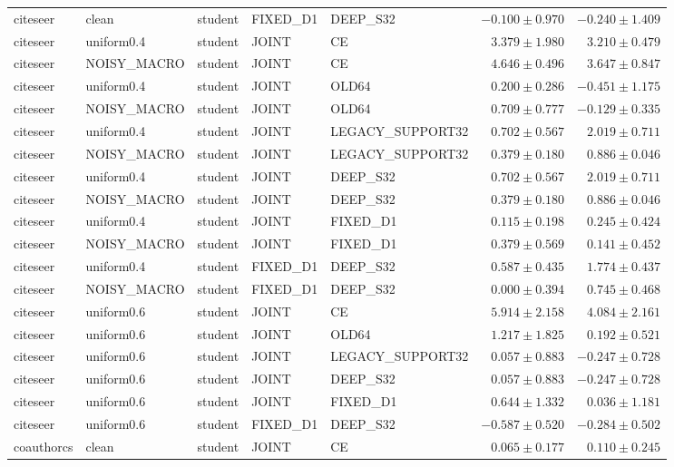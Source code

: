 \begin{longtable}{lllllrr}
citeseer & clean & student & FIXED\_D1 & DEEP\_S32 & $-0.100 \pm 0.970$ & $-0.240 \pm 1.409$ \\
citeseer & uniform0.4 & student & JOINT & CE & $3.379 \pm 1.980$ & $3.210 \pm 0.479$ \\
citeseer & NOISY\_MACRO & student & JOINT & CE & $4.646 \pm 0.496$ & $3.647 \pm 0.847$ \\
citeseer & uniform0.4 & student & JOINT & OLD64 & $0.200 \pm 0.286$ & $-0.451 \pm 1.175$ \\
citeseer & NOISY\_MACRO & student & JOINT & OLD64 & $0.709 \pm 0.777$ & $-0.129 \pm 0.335$ \\
citeseer & uniform0.4 & student & JOINT & LEGACY\_SUPPORT32 & $0.702 \pm 0.567$ & $2.019 \pm 0.711$ \\
citeseer & NOISY\_MACRO & student & JOINT & LEGACY\_SUPPORT32 & $0.379 \pm 0.180$ & $0.886 \pm 0.046$ \\
citeseer & uniform0.4 & student & JOINT & DEEP\_S32 & $0.702 \pm 0.567$ & $2.019 \pm 0.711$ \\
citeseer & NOISY\_MACRO & student & JOINT & DEEP\_S32 & $0.379 \pm 0.180$ & $0.886 \pm 0.046$ \\
citeseer & uniform0.4 & student & JOINT & FIXED\_D1 & $0.115 \pm 0.198$ & $0.245 \pm 0.424$ \\
citeseer & NOISY\_MACRO & student & JOINT & FIXED\_D1 & $0.379 \pm 0.569$ & $0.141 \pm 0.452$ \\
citeseer & uniform0.4 & student & FIXED\_D1 & DEEP\_S32 & $0.587 \pm 0.435$ & $1.774 \pm 0.437$ \\
citeseer & NOISY\_MACRO & student & FIXED\_D1 & DEEP\_S32 & $0.000 \pm 0.394$ & $0.745 \pm 0.468$ \\
citeseer & uniform0.6 & student & JOINT & CE & $5.914 \pm 2.158$ & $4.084 \pm 2.161$ \\
citeseer & uniform0.6 & student & JOINT & OLD64 & $1.217 \pm 1.825$ & $0.192 \pm 0.521$ \\
citeseer & uniform0.6 & student & JOINT & LEGACY\_SUPPORT32 & $0.057 \pm 0.883$ & $-0.247 \pm 0.728$ \\
citeseer & uniform0.6 & student & JOINT & DEEP\_S32 & $0.057 \pm 0.883$ & $-0.247 \pm 0.728$ \\
citeseer & uniform0.6 & student & JOINT & FIXED\_D1 & $0.644 \pm 1.332$ & $0.036 \pm 1.181$ \\
citeseer & uniform0.6 & student & FIXED\_D1 & DEEP\_S32 & $-0.587 \pm 0.520$ & $-0.284 \pm 0.502$ \\
coauthorcs & clean & student & JOINT & CE & $0.065 \pm 0.177$ & $0.110 \pm 0.245$ \\

\end{longtable}
